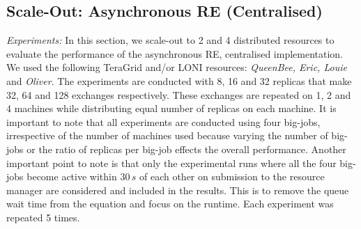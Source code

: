 \documentclass{rspublic}
\newcommand{\alnote}[1]{ {\textcolor{blue} { ***andre: #1 }}}
\newcommand{\alnote}[1]{}
\begin{document}
\subsection{Scale-Out: Asynchronous RE (Centralised)}
{\it Experiments:} In this section, we scale-out to 2 and 4
distributed resources to evaluate the performance of the asynchronous
RE, centralised implementation.  We used the following TeraGrid and/or
LONI resources: \emph{QueenBee, Eric, Louie} and \emph{Oliver}. The
experiments are conducted with 8, 16 and 32 replicas that make 32, 64
and 128 exchanges respectively. These exchanges are repeated on 1, 2
and 4 machines while distributing equal number of replicas on each
machine. It is important to note that all experiments are conducted
using four big-jobs, irrespective of the number of machines used
because varying the number of big-jobs or the ratio of replicas per
big-job effects the overall performance.  Another important point to
note is that only the experimental runs where all the four
big-jobs %
become active within $30\,s$ of each other on submission to the
resource manager are considered and included in the results. This is
to remove the queue wait time from the equation and focus on the
runtime. Each experiment was repeated 5 times.

%
\end{document}
